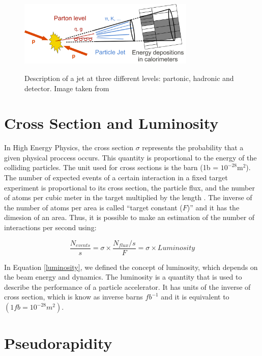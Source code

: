  \begin{figure}[h] 
 \centering
 \caption{Description of a jet at three different levels: partonic, hadronic and detector. Image taken from \cite{Image_jet_definitions}}
 \includegraphics[width=0.75\textwidth]{./Capitulos/VariableDefinitions/jets_definitions}  
 \label{Jets_definitions}
 \end{figure}
 
 \section{Cross Section and Luminosity}
 
 In High Energy Physics, the cross section $\sigma$ represents the probability that a given physical proccess occurs. This quantity is proportional to the energy of the colliding particles. The unit used for cross sections is the barn (1b = $10^{-28} \text{m}^2$). The number of expected events of a certain interaction in a fixed target experiment is proportional to its cross section, the particle flux, and the number of atoms per cubic meter in the target multiplied by the length \cite{Data_analysis_techniques}. The inverse of the number of atoms per area is called ``target constant ($F$)'' and it has the dimesion of an area. Thus, it is possible to make an estimation of the number of interactions per second using:
 
 \begin{equation}
 \label{luminosity}
  \frac{N_{events}}{s} = \sigma \times \frac{N_{flux}/s}{F} = \sigma \times Luminosity
 \end{equation}

 In Equation \ref{luminosity}, we defined the concept of luminosity, which depends on the beam energy and dynamics.  The luminosity is a quantity that is used to describe the performance of a particle accelerator. It has units of the inverse of cross section, which is know as inverse barns $fb^{-1}$ and it is equivalent to $(1 fb = 10^{-28} m^2)$. 

 \section{Pseudorapidity}
  
